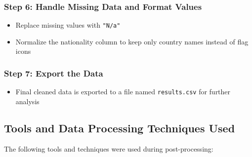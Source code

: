 \documentclass[12pt,a4paper]{article}
\begin{document}
\subsubsection{Step 6: Handle Missing Data and Format Values}
\begin{itemize}
\item Replace missing values with \texttt{"N/a"}
\item Normalize the nationality column to keep only country names instead of flag icons
\end{itemize}

\subsubsection{Step 7: Export the Data}
\begin{itemize}
\item Final cleaned data is exported to a file named \texttt{results.csv} for further analysis
\end{itemize}

\subsection{Tools and Data Processing Techniques Used}
The following tools and techniques were used during post-processing:
\end{document}
